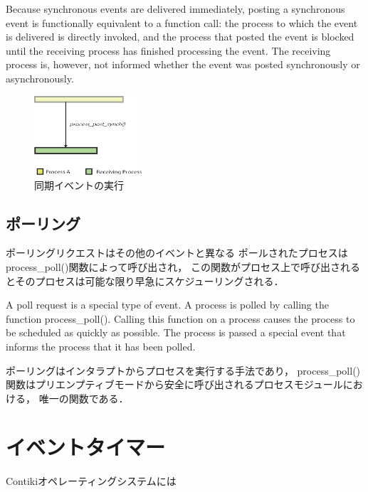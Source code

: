 Because synchronous events are delivered immediately,
posting a synchronous event is functionally equivalent to a function call: 
the process to which the event is delivered is directly invoked, 
and the process that posted the event is blocked until the receiving process has finished processing the event.
The receiving process is, however, not informed whether the event was posted synchronously or asynchronously.
\begin{figure}[htbp]
 \begin{center}
  \includegraphics[width=40mm]{./images/synchronous_event.eps}
 \end{center}
 \caption{同期イベントの実行}
 \label{fig:synchronous_event}
\end{figure}


\subsection{ポーリング}
ポーリングリクエストはその他のイベントと異なる
ポールされたプロセスはprocess\_poll()関数によって呼び出され，
この関数がプロセス上で呼び出されるとそのプロセスは可能な限り早急にスケジューリングされる．

A poll request is a special type of event. A process is polled by calling the function process\_poll().
Calling this function on a process causes the process to be scheduled as quickly as possible.
The process is passed a special event that informs the process that it has been polled.

ポーリングはインタラプトからプロセスを実行する手法であり，
process\_poll()関数はプリエンプティブモードから安全に呼び出されるプロセスモジュールにおける，
唯一の関数である．


\section{イベントタイマー}
Contikiオペレーティングシステムには



